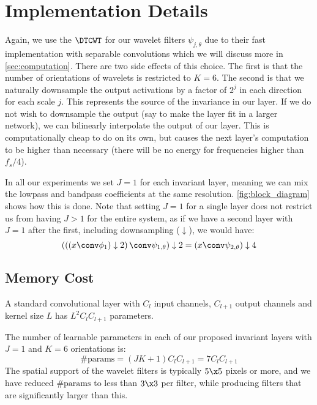 \section{Implementation Details}\label{sec:implementation}
Again, we use the $\DTCWT$ \cite{selesnick_dual-tree_2005} for our wavelet filters
$\psi_{j, \theta}$ due to their fast implementation with separable convolutions
which we will discuss more in \autoref{sec:computation}.  There are two side
effects of this choice. The first is that the number of orientations of wavelets
is restricted to $K=6$. The second is that we naturally downsample the output
activations by a factor of $2^j$ in each direction for each scale $j$. This represents the
source of the invariance in our layer. If we do not wish to downsample the
output (say to make the layer fit in a larger network), we can bilinearly
interpolate the output of our layer. This is computationally cheap to do on its
own, but causes the next layer's computation to be higher than necessary (there
will be no energy for frequencies higher than $f_s/4$).

In all our experiments we set $J=1$ for each invariant layer,
meaning we can mix the lowpass and bandpass coefficients at the same resolution.
\autoref{fig:block_diagram} shows how this is done. Note that setting $J=1$ for
a single layer does not restrict us from having $J>1$ for the entire system, as
if we have a second layer with $J=1$ after the first, including downsampling
($\downarrow$), we would have:
%
\begin{equation}
  \left(\left(\left(x \conv \phi_1\right) \downarrow 2\right) \conv \psi_{1, \theta}\right) \downarrow 2 = \left(x \conv \psi_{2, \theta}\right) \downarrow 4
\end{equation}

\subsection{Memory Cost}\label{sec:memory}
A standard convolutional layer with $C_l$ input channels, $C_{l+1}$ output channels
and kernel size $L$ has $L^2C_{l}C_{l+1}$ parameters. 

The number of learnable parameters in each of our proposed invariant layers with
$J=1$ and $K=6$ orientations is:
%
\begin{equation}
  \text{\#params} = (JK+1)C_{l}C_{l+1} = 7C_{l}C_{l+1}
\end{equation} 
%
The spatial support of the wavelet filters is typically $5\x 5$ pixels or more,
and we have reduced $\text{\#params}$ to less than $3\x3$ per filter, while
producing filters that are significantly larger than this.

